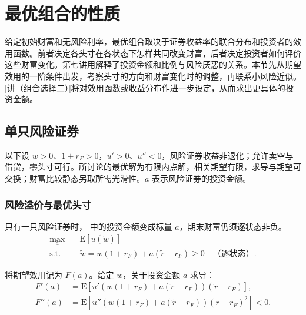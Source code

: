 \section{最优组合的性质}\label{sec:wj-eight-3}
给定初始财富和无风险利率，最优组合取决于证券收益率的联合分布和投资者的效用函数。前者决定各头寸在各状态下怎样共同改变财富，后者决定投资者如何评价这些财富变化。第七讲用解释了投资金额和比例与风险厌恶的关系。本节先从期望效用的一阶条件出发，考察头寸的方向和财富变化时的调整，再联系小风险近似。[讲（组合选择二）]将对效用函数或收益分布作进一步设定，从而求出更具体的投资金额。

\subsection{单只风险证券}\label{sec:wj-eight-single}
\begin{tcolorbox}[knowledge,title=单风险证券模型的条件]
以下设 $w>0$、$1+r_F>0$，$u'>0$、$u''<0$，风险证券收益非退化；允许卖空与借贷，零头寸可行。所讨论的最优解为有限内点解，相关期望有限，求导与期望可交换；财富比较静态另取所需光滑性。$a$ 表示风险证券的投资金额。
\end{tcolorbox}

\subsubsection{风险溢价与最优头寸}
只有一只风险证券时， 中的投资金额变成标量 $a$，期末财富仍须逐状态非负。
\[
 \begin{aligned}
 \max_a\quad &\mathrm E[u(\tilde w)]\\
 \text{s.t.}\quad &\tilde w=w(1+r_F)+a(\tilde r-r_F)\ge0
 \quad\text{（逐状态）}.
 \end{aligned}
\]

将期望效用记为 $F(a)$。给定 $w$，关于投资金额 $a$ 求导：
\[
\begin{aligned}
 F'(a)&=\mathrm E\!\left[u'\!\left(w(1+r_F)+a(\tilde r-r_F)\right)
                          (\tilde r-r_F)\right],\\
 F''(a)&=\mathrm E\!\left[u''\!\left(w(1+r_F)+a(\tilde r-r_F)\right)
                           (\tilde r-r_F)^2\right]<0.
\end{aligned}
\]

